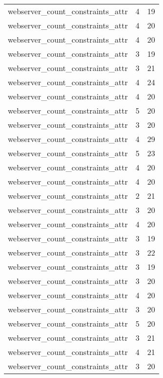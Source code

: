 \begin{table}
\begin{tabular}{lrr}
webserver\_count\_constraints\_attr &         4 &        19 \\
webserver\_count\_constraints\_attr &         4 &        20 \\
webserver\_count\_constraints\_attr &         4 &        20 \\
webserver\_count\_constraints\_attr &         3 &        19 \\
webserver\_count\_constraints\_attr &         3 &        21 \\
webserver\_count\_constraints\_attr &         4 &        24 \\
webserver\_count\_constraints\_attr &         4 &        20 \\
webserver\_count\_constraints\_attr &         5 &        20 \\
webserver\_count\_constraints\_attr &         3 &        20 \\
webserver\_count\_constraints\_attr &         4 &        29 \\
webserver\_count\_constraints\_attr &         5 &        23 \\
webserver\_count\_constraints\_attr &         4 &        20 \\
webserver\_count\_constraints\_attr &         4 &        20 \\
webserver\_count\_constraints\_attr &         2 &        21 \\
webserver\_count\_constraints\_attr &         3 &        20 \\
webserver\_count\_constraints\_attr &         4 &        20 \\
webserver\_count\_constraints\_attr &         3 &        19 \\
webserver\_count\_constraints\_attr &         3 &        22 \\
webserver\_count\_constraints\_attr &         3 &        19 \\
webserver\_count\_constraints\_attr &         3 &        20 \\
webserver\_count\_constraints\_attr &         4 &        20 \\
webserver\_count\_constraints\_attr &         3 &        20 \\
webserver\_count\_constraints\_attr &         5 &        20 \\
webserver\_count\_constraints\_attr &         3 &        21 \\
webserver\_count\_constraints\_attr &         4 &        21 \\
webserver\_count\_constraints\_attr &         3 &        20 \\

\end{tabular}
\end{table}

